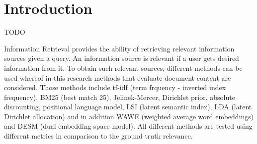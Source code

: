 \section{Introduction}

TODO

Information Retrieval provides the ability of retrieving relevant information sources given a query. An information source is relevant if a user gets desired information from it. To obtain such relevant sources, different methods can be used whereof in this research methods that evaluate document content are considered. Those methods include tf-idf (term frquency - inverted index frequency), BM25 (best match 25), Jelinek-Mercer, Dirichlet prior, absolute discounting, positional language model, LSI (latent semantic index), LDA (latent Dirichlet allocation) and in addition WAWE (weighted average word embeddings) and DESM (dual embedding space model). All different methods are tested using different metrics in comparison to the ground truth relevance.


